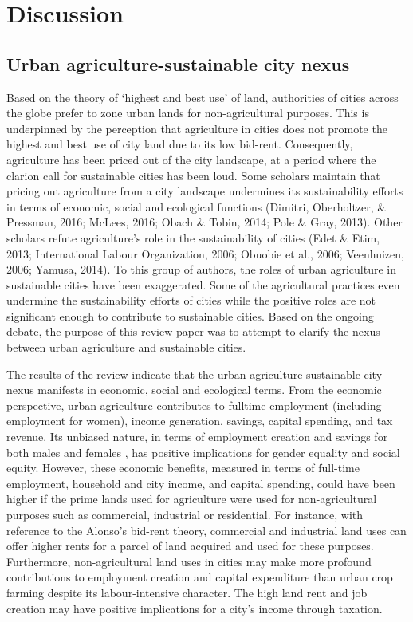 \chapter{Discussion} %

\label{Chapter:Discussion}

\section{Urban agriculture-sustainable city nexus}

Based on the theory of ‘highest and best use’ of land, authorities of cities across the globe prefer to zone urban lands for non-agricultural purposes. This is underpinned by the perception that agriculture in cities does not promote the highest and best use of city land due to its low bid-rent. Consequently, agriculture has been priced out of the city landscape, at a period where the clarion call for sustainable cities has been loud. Some scholars maintain that pricing out agriculture from a city landscape undermines its sustainability efforts in terms of economic, social and ecological functions \cite{Binns2013, Prain2010, Ackerman2014, Opitz2016, Specht2014} (Dimitri, Oberholtzer, \& Pressman, 2016; McLees, 2016; Obach \& Tobin, 2014; Pole \& Gray, 2013). Other scholars refute agriculture's role in the sustainability of cities (Edet \& Etim, 2013; International Labour Organization, 2006; Obuobie et al., 2006; Veenhuizen, 2006; Yamusa, 2014). To this group of authors, the roles of urban agriculture in sustainable cities have been exaggerated. Some of the agricultural practices even undermine the sustainability efforts of cities while the positive roles are not significant enough to contribute to sustainable cities. Based on the ongoing debate, the purpose of this review paper was to attempt to clarify the nexus between urban agriculture and sustainable cities.

The results of the review indicate that the urban agriculture-sustainable city nexus manifests in economic, social and ecological terms. From the economic perspective, urban agriculture contributes to fulltime employment (including employment for women), income generation, savings, capital spending, and tax revenue. Its unbiased nature, in terms of employment creation and savings for both males and females \cite{Prain2010}, has positive implications for gender equality and social equity. However, these economic benefits, measured in terms of full-time employment, household and city income, and capital spending, could have been higher if the prime lands used for agriculture were used for non-agricultural purposes such as commercial, industrial or residential. For instance, with reference to the Alonso's bid-rent theory, commercial and industrial land uses can offer higher rents for a parcel of land acquired and used for these purposes. Furthermore, non-agricultural land uses in cities may make more profound contributions to employment creation and capital expenditure than urban crop farming despite its labour-intensive character. The high land rent and job creation may have positive implications for a city's income through taxation.

